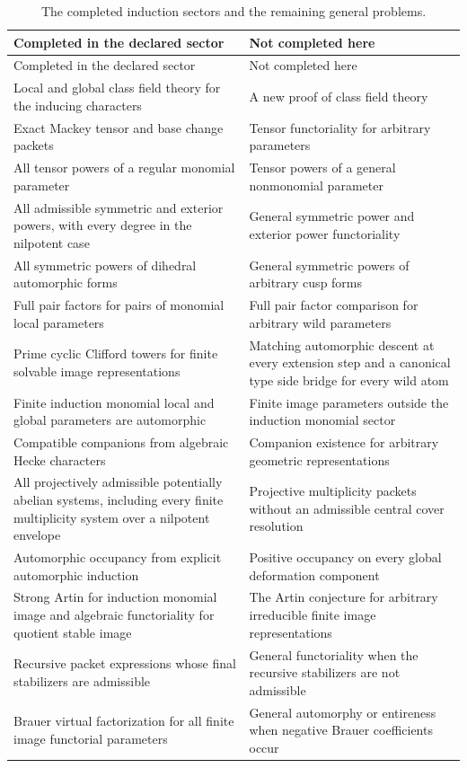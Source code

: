 \documentclass{aomart}
\theoremstyle{definition}
\theoremstyle{remark}
\begin{document}
\begin{longtable}{p{}p{}}
\caption{The completed induction sectors and the remaining general problems.}\label{tab:boundary}\\
\toprule
Completed in the declared sector & Not completed here\\
\midrule
\endfirsthead
\toprule
Completed in the declared sector & Not completed here\\
\midrule
\endhead
Local and global class field theory for the inducing characters & A new proof of class field theory\\
Exact Mackey tensor and base change packets & Tensor functoriality for arbitrary parameters\\
All tensor powers of a regular monomial parameter & Tensor powers of a general nonmonomial parameter\\
All admissible symmetric and exterior powers, with every degree in the nilpotent case & General symmetric power and exterior power functoriality\\
All symmetric powers of dihedral automorphic forms & General symmetric powers of arbitrary cusp forms\\
Full pair factors for pairs of monomial local parameters & Full pair factor comparison for arbitrary wild parameters\\
Prime cyclic Clifford towers for finite solvable image representations & Matching automorphic descent at every extension step and a canonical type side bridge for every wild atom\\
Finite induction monomial local and global parameters are automorphic & Finite image parameters outside the induction monomial sector\\
Compatible companions from algebraic Hecke characters & Companion existence for arbitrary geometric representations\\
All projectively admissible potentially abelian systems, including every finite multiplicity system over a nilpotent envelope & Projective multiplicity packets without an admissible central cover resolution\\
Automorphic occupancy from explicit automorphic induction & Positive occupancy on every global deformation component\\
Strong Artin for induction monomial image and algebraic functoriality for quotient stable image & The Artin conjecture for arbitrary irreducible finite image representations\\
Recursive packet expressions whose final stabilizers are admissible & General functoriality when the recursive stabilizers are not admissible\\
Brauer virtual factorization for all finite image functorial parameters & General automorphy or entireness when negative Brauer coefficients occur\\
\bottomrule
\end{longtable}
\end{document}
